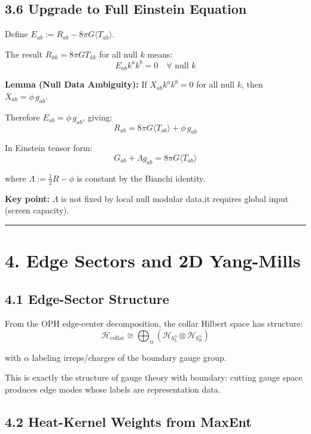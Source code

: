 \subsection{3.6 Upgrade to Full Einstein Equation}\label{36-upgrade-to-full-einstein-equation}

Define \(E_{ab} := R_{ab} - 8\pi G \langle T_{ab} \rangle\).

The result \(R_{kk} = 8\pi G T_{kk}\) for all null \(k\) means: \[E_{ab} k^a k^b = 0 \quad \forall \text{ null } k\]

\textbf{Lemma (Null Data Ambiguity):} If \(X_{ab} k^a k^b = 0\) for all null \(k\), then \(X_{ab} = \phi \, g_{ab}\).

Therefore \(E_{ab} = \phi \, g_{ab}\), giving: \[R_{ab} = 8\pi G \langle T_{ab} \rangle + \phi \, g_{ab}\]

In Einstein tensor form: \[\boxed{G_{ab} + \Lambda g_{ab} = 8\pi G \langle T_{ab} \rangle}\]

where \(\Lambda := \frac{1}{2}R - \phi\) is constant by the Bianchi identity.

\textbf{Key point:} \(\Lambda\) is not fixed by local null modular data,it requires global input (screen capacity).

\begin{center}\rule{0.5\linewidth}{0.5pt}\end{center}

\section{4. Edge Sectors and 2D Yang-Mills}\label{4-edge-sectors-and-2d-yang-mills}

\subsection{4.1 Edge-Sector Structure}\label{41-edge-sector-structure}

From the OPH edge-center decomposition, the collar Hilbert space has structure: \[\mathcal{H}_{\text{collar}} \cong \bigoplus_{\alpha} \left(\mathcal{H}_{b_L^\alpha} \otimes \mathcal{H}_{b_R^\alpha}\right)\]

with \(\alpha\) labeling irreps/charges of the boundary gauge group.

This is exactly the structure of gauge theory with boundary: cutting gauge space produces edge modes whose labels are representation data.

\subsection{4.2 Heat-Kernel Weights from MaxEnt}\label{42-heat-kernel-weights-from-maxent}

